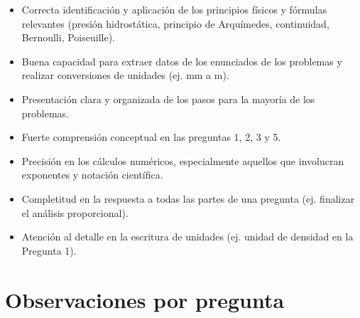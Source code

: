\documentclass[11pt,a4paper]{article}
\begin{document}
\vspace{4pt}
\begin{minipage}[t]{0.48\linewidth}
  \begin{tcolorbox}[cajaFortaleza, title={Fortalezas}]
\begin{itemize}[leftmargin=1.5em, itemsep=2pt]
  \item Correcta identificación y aplicación de los principios físicos y fórmulas relevantes (presión hidrostática, principio de Arquímedes, continuidad, Bernoulli, Poiseuille).
  \item Buena capacidad para extraer datos de los enunciados de los problemas y realizar conversiones de unidades (ej. mm a m).
  \item Presentación clara y organizada de los pasos para la mayoría de los problemas.
  \item Fuerte comprensión conceptual en las preguntas 1, 2, 3 y 5.
\end{itemize}
  \end{tcolorbox}
\end{minipage}
\hfill
\begin{minipage}[t]{0.48\linewidth}
  \begin{tcolorbox}[cajaMejora, title={Areas de mejora}]
\begin{itemize}[leftmargin=1.5em, itemsep=2pt]
  \item Precisión en los cálculos numéricos, especialmente aquellos que involucran exponentes y notación científica.
  \item Completitud en la respuesta a todas las partes de una pregunta (ej. finalizar el análisis proporcional).
  \item Atención al detalle en la escritura de unidades (ej. unidad de densidad en la Pregunta 1).
\end{itemize}
  \end{tcolorbox}
\end{minipage}

\section*{Observaciones por pregunta}
\end{document}
